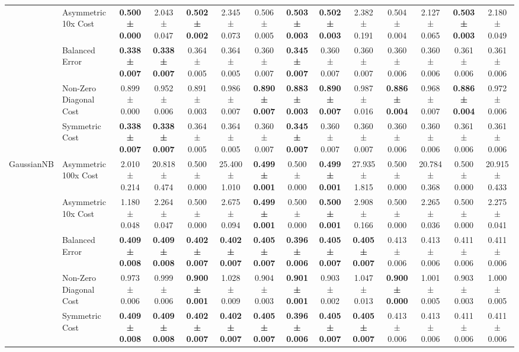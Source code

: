 \begin{table}[H]
{\begin{tabular}{llcccccccccccc}
 & Asymmetric 10x Cost & \textbf{0.500 ± 0.000} & 2.043 ± 0.047 & \textbf{0.502 ± 0.002} & 2.345 ± 0.073 & 0.506 ± 0.005 & \textbf{0.503 ± 0.003} & \textbf{0.502 ± 0.003} & 2.382 ± 0.191 & 0.504 ± 0.004 & 2.127 ± 0.065 & \textbf{0.503 ± 0.003} & 2.180 ± 0.049 \\
 & Balanced Error & \textbf{0.338 ± 0.007} & \textbf{0.338 ± 0.007} & 0.364 ± 0.005 & 0.364 ± 0.005 & 0.360 ± 0.007 & \textbf{0.345 ± 0.007} & 0.360 ± 0.007 & 0.360 ± 0.007 & 0.360 ± 0.006 & 0.360 ± 0.006 & 0.361 ± 0.006 & 0.361 ± 0.006 \\
 & Non-Zero Diagonal Cost & 0.899 ± 0.000 & 0.952 ± 0.006 & 0.891 ± 0.003 & 0.986 ± 0.007 & \textbf{0.890 ± 0.007} & \textbf{0.883 ± 0.003} & \textbf{0.890 ± 0.007} & 0.987 ± 0.016 & \textbf{0.886 ± 0.004} & 0.968 ± 0.007 & \textbf{0.886 ± 0.004} & 0.972 ± 0.006 \\
 & Symmetric Cost & \textbf{0.338 ± 0.007} & \textbf{0.338 ± 0.007} & 0.364 ± 0.005 & 0.364 ± 0.005 & 0.360 ± 0.007 & \textbf{0.345 ± 0.007} & 0.360 ± 0.007 & 0.360 ± 0.007 & 0.360 ± 0.006 & 0.360 ± 0.006 & 0.361 ± 0.006 & 0.361 ± 0.006 \\
\cline{1-14}
\multirow[t]{5}{*}{GaussianNB} & Asymmetric 100x Cost & 2.010 ± 0.214 & 20.818 ± 0.474 & 0.500 ± 0.000 & 25.400 ± 1.010 & \textbf{0.499 ± 0.001} & 0.500 ± 0.000 & \textbf{0.499 ± 0.001} & 27.935 ± 1.815 & 0.500 ± 0.000 & 20.784 ± 0.368 & 0.500 ± 0.000 & 20.915 ± 0.433 \\
 & Asymmetric 10x Cost & 1.180 ± 0.048 & 2.264 ± 0.047 & 0.500 ± 0.000 & 2.675 ± 0.094 & \textbf{0.499 ± 0.001} & 0.500 ± 0.000 & \textbf{0.500 ± 0.001} & 2.908 ± 0.166 & 0.500 ± 0.000 & 2.265 ± 0.036 & 0.500 ± 0.000 & 2.275 ± 0.041 \\
 & Balanced Error & \textbf{0.409 ± 0.008} & \textbf{0.409 ± 0.008} & \textbf{0.402 ± 0.007} & \textbf{0.402 ± 0.007} & \textbf{0.405 ± 0.007} & \textbf{0.396 ± 0.006} & \textbf{0.405 ± 0.007} & \textbf{0.405 ± 0.007} & 0.413 ± 0.006 & 0.413 ± 0.006 & 0.411 ± 0.006 & 0.411 ± 0.006 \\
 & Non-Zero Diagonal Cost & 0.973 ± 0.006 & 0.999 ± 0.006 & \textbf{0.900 ± 0.001} & 1.028 ± 0.009 & 0.904 ± 0.003 & \textbf{0.901 ± 0.001} & 0.903 ± 0.002 & 1.047 ± 0.013 & \textbf{0.900 ± 0.000} & 1.001 ± 0.005 & 0.903 ± 0.003 & 1.000 ± 0.005 \\
 & Symmetric Cost & \textbf{0.409 ± 0.008} & \textbf{0.409 ± 0.008} & \textbf{0.402 ± 0.007} & \textbf{0.402 ± 0.007} & \textbf{0.405 ± 0.007} & \textbf{0.396 ± 0.006} & \textbf{0.405 ± 0.007} & \textbf{0.405 ± 0.007} & 0.413 ± 0.006 & 0.413 ± 0.006 & 0.411 ± 0.006 & 0.411 ± 0.006 \\

\end{tabular}}
\end{table}
